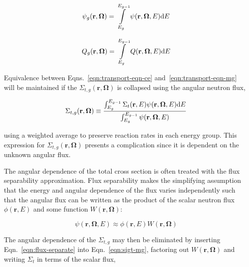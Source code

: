 \begin{dmath}
\label{eqn:groupwise-flux}
\psi_{g}(\mathbf{r},\mathbf{\Omega}) = \int\displaylimits_{E_{g}}^{E_{g-1}} \psi(\mathbf{r},\mathbf{\Omega},E)\mathrm{d}E
\end{dmath}

\begin{dmath}
\label{eqn:groupwise-source}
Q_{g}(\mathbf{r},\mathbf{\Omega}) = \int\displaylimits_{E_{g}}^{E_{g-1}} Q(\mathbf{r},\mathbf{\Omega},E)\mathrm{d}E
\end{dmath}


Equivalence between Eqns.~\ref{eqn:transport-eqn-ce} and~\ref{eqn:transport-eqn-mg} will be maintained if the $\Sigma_{t,g}(\mathbf{r},\mathbf{\Omega})$ is collapsed using the angular neutron flux,

\begin{dmath}
\label{eqn:sigt-mg}
\Sigma_{t,g}(\mathbf{r},\mathbf{\Omega}) \equiv \frac{\int\displaylimits_{E_{g}}^{E_{g-1}} \Sigma_{t}(\mathbf{r},E)\psi(\mathbf{r},\mathbf{\Omega},E)\mathrm{d}E}{\int\displaylimits_{E_{g}}^{E_{g-1}} \psi(\mathbf{r},\mathbf{\Omega},E)}
\end{dmath}

\noindent using a weighted average to preserve reaction rates in each energy group. This expression for $\Sigma_{t,g}(\mathbf{r},\mathbf{\Omega})$ presents a complication since it is dependent on the unknown angular flux.

The angular dependence of the total cross section is often treated with the flux separability approximation. Flux separability makes the simplifying assumption that the energy and angular dependence of the flux varies independently such that the angular flux can be written as the product of the scalar neutron flux $\phi(\mathbf{r},E)$ and some function $W(\mathbf{r}, \mathbf{\Omega})$:

\begin{dmath}
\label{eqn:flux-separate}
\psi(\mathbf{r},\mathbf{\Omega},E) \approx \phi(\mathbf{r},E) W(\mathbf{r},\mathbf{\Omega})
\end{dmath}

\noindent The angular dependence of the $\Sigma_{t,g}$ may then be eliminated by inserting Eqn.~\ref{eqn:flux-separate} into Eqn.~\ref{eqn:sigt-mg}, factoring out $W(\mathbf{r},\mathbf{\Omega})$ and writing $\Sigma_{t}$ in terms of the scalar flux,

